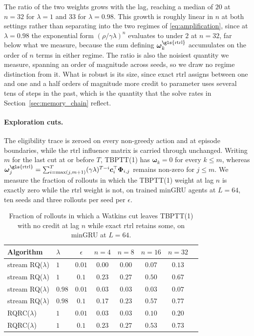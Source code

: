 \documentclass{article}
\begin{document}
The ratio of the two weights grows with the lag, reaching a median of $20$ at
$n{=}32$ for $\lambda{=}1$ and $33$ for $\lambda{=}0.98$. This growth is roughly
linear in $n$ at both settings rather than separating into the two regimes of
\eqref{eq:amplification}, since at $\lambda{=}0.98$ the exponential form
$(\rho/\gamma\lambda)^{n}$ evaluates to under $2$ at $n{=}32$, far below what we
measure, because the sum defining $\boldsymbol{\omega}_k^{\mathrm{\gls{rtrl}}}$
accumulates on the order of $n$ terms in either regime. The ratio is also the
noisiest quantity we measure, spanning an order of magnitude across seeds, so we
draw no regime distinction from it. What is robust is its size, since exact \gls{rtrl}
assigns between one and one and a half orders of magnitude more credit to
parameter uses several tens of steps in the past, which is the quantity that the
solve rates in Section~\ref{sec:memory_chain} reflect.

\paragraph{Exploration cuts.}
The eligibility trace is zeroed on every non-greedy action and at episode boundaries, while
the \gls{rtrl} influence matrix is carried through unchanged. Writing $m$ for the last cut
at or before $T$, TBPTT(1) has $\boldsymbol{\omega}_k = 0$ for every $k \leq m$, whereas
$\boldsymbol{\omega}_j^{\mathrm{\gls{rtrl}}} = \sum_{i=\max(j,m+1)}^{T} (\gamma\lambda)^{T-i}
\boldsymbol{c}_i^\top \boldsymbol{\Phi}_{i,j}$ remains non-zero for $j \leq m$. We measure the
fraction of rollouts in which the TBPTT(1) weight at lag $n$ is exactly zero while the
\gls{rtrl} weight is not, on trained minGRU agents at $L{=}64$, ten seeds and three rollouts
per seed per $\epsilon$.

\begin{table}[htbp]
\centering
\begin{tabular}{llcccccc}
\toprule
Algorithm & $\lambda$ & $\epsilon$ & $n{=}4$ & $n{=}8$ & $n{=}16$ & $n{=}32$ \\
\midrule
stream RQ($\lambda$) & $1$ & $0.01$ & $0.00$ & $0.00$ & $0.07$ & $0.13$ \\
stream RQ($\lambda$) & $1$ & $0.1$ & $0.23$ & $0.27$ & $0.50$ & $0.67$ \\
stream RQ($\lambda$) & $0.98$ & $0.01$ & $0.03$ & $0.03$ & $0.03$ & $0.07$ \\
stream RQ($\lambda$) & $0.98$ & $0.1$ & $0.17$ & $0.23$ & $0.57$ & $0.77$ \\
RQRC($\lambda$) & $1$ & $0.01$ & $0.03$ & $0.03$ & $0.10$ & $0.20$ \\
RQRC($\lambda$) & $1$ & $0.1$ & $0.23$ & $0.27$ & $0.53$ & $0.73$ \\
\bottomrule
\end{tabular}
\caption{Fraction of rollouts in which a Watkins cut leaves TBPTT(1) with no credit at lag
$n$ while exact \gls{rtrl} retains some, on minGRU at $L{=}64$.}
\label{tab:watkins}
\end{table}
\end{document}
